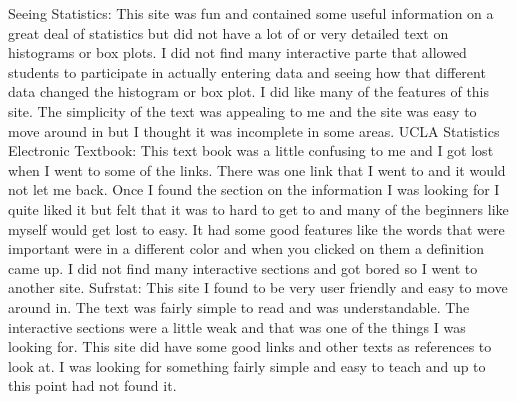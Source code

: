       Seeing Statistics: This site was fun and contained some useful information on a great deal of statistics but did not have a lot of or  very detailed text on histograms or box plots. I did not find many interactive parte that allowed students to participate in actually entering data and seeing how that different data changed the histogram or box plot. I did like many of the features of this site. The simplicity of the text was appealing to me and the site was easy to move around in but I thought it was incomplete in some areas. 
     UCLA Statistics Electronic Textbook: This text book was a little confusing to me and I got lost when I went to some of the links. There was one link that I went to and it would not let me back. Once I found the section on the information I was looking for I quite liked it but felt that it was to hard to get to and many of the beginners like myself would get lost to easy. It had some good features like the words that were important were in a different color and when you clicked on them a definition came up. I did not find many interactive sections and got bored so I went to another site.
     Sufrstat: This site I found to be very user friendly and easy to move around in. The text was fairly simple to read and was understandable. The interactive sections were a little weak and that was one of the things I was looking for. This site did have some good links and other texts as references to look at. I was looking for something fairly simple and easy to teach and up to this point had not found it.
    


